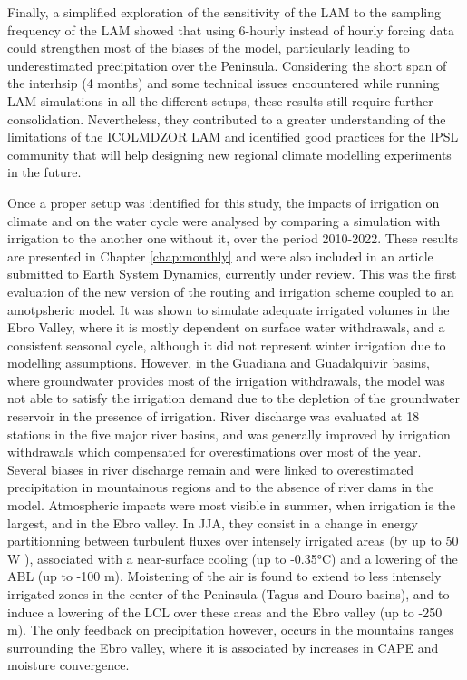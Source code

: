 Finally, a simplified exploration of the sensitivity of the LAM to the sampling frequency of the LAM showed that using 6-hourly instead of hourly forcing data could strengthen most of the biases of the model, particularly leading to underestimated precipitation over the Peninsula.
Considering the short span of the interhsip (4 months) and some technical issues encountered while running LAM simulations in all the different setups, these results still require further consolidation. Nevertheless, they contributed to a greater understanding of the limitations of the ICOLMDZOR LAM and identified good practices for the IPSL community that will help designing new regional climate modelling experiments in the future.

\hfill

Once a proper setup was identified for this study, the impacts of irrigation on climate and on the water cycle were analysed by comparing a simulation with irrigation to the another one without it, over the period 2010-2022.
These results are presented in Chapter \ref{chap:monthly} and were also included in an article submitted to Earth System Dynamics, currently under review.
This was the first evaluation of the new version of the routing and irrigation scheme coupled to an amotpsheric model. It was shown to simulate adequate irrigated volumes in the Ebro Valley, where it is mostly dependent on surface water withdrawals, and a consistent seasonal cycle, although it did not represent winter irrigation due to modelling assumptions.
However, in the Guadiana and Guadalquivir basins, where groundwater provides most of the irrigation withdrawals, the model was not able to satisfy the irrigation demand due to the depletion of the groundwater reservoir in the presence of irrigation. River discharge was evaluated at 18 stations in the five major river basins, and was generally improved by irrigation withdrawals which compensated for overestimations over most of the year.
Several biases in river discharge remain and were linked to overestimated precipitation in mountainous regions and to the absence of river dams in the model.
Atmospheric impacts were most visible in summer, when irrigation is the largest, and in the Ebro valley. In JJA, they consist in a change in energy partitionning between turbulent fluxes over intensely irrigated areas (by up to 50 W \persqm), associated with a near-surface cooling (up to -0.35°C) and a lowering of the ABL (up to -100 m). Moistening of the air is found to extend to less intensely irrigated zones in the center of the Peninsula (Tagus and Douro basins), and to induce a lowering of the LCL over these areas and the Ebro valley (up to -250 m). The only feedback on precipitation however, occurs in the mountains ranges surrounding the Ebro valley, where it is associated by increases in CAPE and moisture convergence. 

